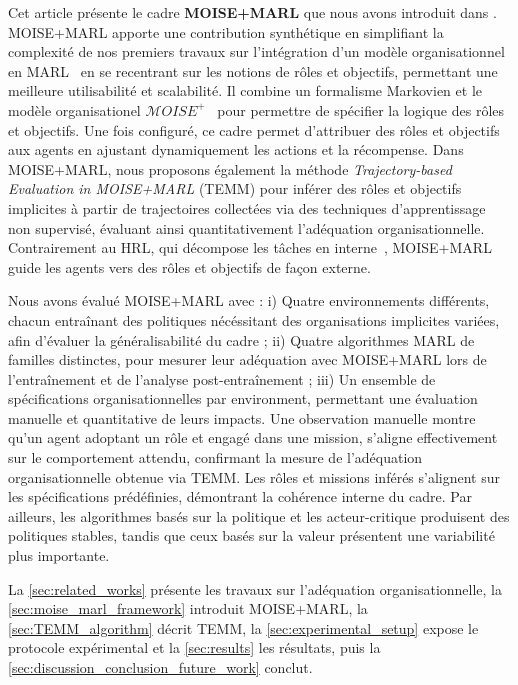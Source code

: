 \documentclass[francais,ROIA,Unicode,manuscript]{cedram}
\begin{document}
\noindent Cet article présente le cadre \textbf{MOISE+MARL} que nous avons introduit dans \cite{soule2025moisemarl}. MOISE+MARL apporte une contribution synthétique en simplifiant la complexité de nos premiers travaux sur l'intégration d'un modèle organisationnel en MARL~\cite{soule2024paper-jfsma, soule2024aomea} en se recentrant sur les notions de rôles et objectifs, permettant une meilleure utilisabilité et scalabilité. Il combine un formalisme Markovien et le modèle organisationel $\mathcal{M}OISE^+$~\cite{Hubner2007} pour permettre de spécifier la logique des rôles et objectifs. Une fois configuré, ce cadre permet d'attribuer des rôles et objectifs aux agents en ajustant dynamiquement les actions et la récompense. Dans MOISE+MARL, nous proposons également la méthode \textit{Trajectory-based Evaluation in MOISE+MARL} (TEMM) pour inférer des rôles et objectifs implicites à partir de trajectoires collectées via des techniques d'apprentissage non supervisé, évaluant ainsi quantitativement l'adéquation organisationnelle. Contrairement au HRL, qui décompose les tâches en interne~\cite{Qi2024, Matsuyama2025, SaoMai2024}, MOISE+MARL guide les agents vers des rôles et objectifs de façon externe.

Nous avons évalué MOISE+MARL avec :
i) Quatre environnements différents, chacun entraînant des politiques nécéssitant des organisations implicites variées, afin d'évaluer la généralisabilité du cadre
; \quad
ii) Quatre algorithmes MARL de familles distinctes, pour mesurer leur adéquation avec MOISE+MARL lors de l'entraînement et de l'analyse post-entraînement
; \quad
iii) Un ensemble de spécifications organisationnelles par environment, permettant une évaluation manuelle et quantitative de leurs impacts.
%
Une observation manuelle montre qu'un agent adoptant un rôle et engagé dans une mission, s'aligne effectivement sur le comportement attendu, confirmant la mesure de l'adéquation organisationnelle obtenue via TEMM. Les rôles et missions inférés s'alignent sur les spécifications prédéfinies, démontrant la cohérence interne du cadre. Par ailleurs, les algorithmes basés sur la politique et les acteur-critique produisent des politiques stables, tandis que ceux basés sur la valeur présentent une variabilité plus importante.


\noindent La \autoref{sec:related_works} présente les travaux sur l'adéquation organisationnelle, la \autoref{sec:moise_marl_framework} introduit MOISE+MARL, la \autoref{sec:TEMM_algorithm} décrit TEMM, la \autoref{sec:experimental_setup} expose le protocole expérimental et la \autoref{sec:results} les résultats, puis la \autoref{sec:discussion_conclusion_future_work} conclut.
\end{document}
